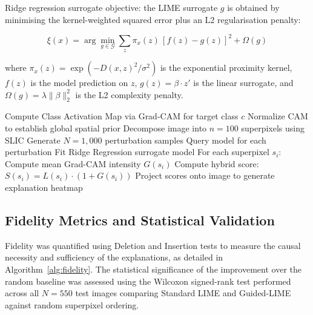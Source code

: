 \documentclass[10pt,twoside]{article}
\begin{document}
Ridge regression surrogate objective: the LIME surrogate $g$ is obtained by minimising the kernel-weighted squared error plus an L2 regularisation penalty:

\begin{equation}
\label{eq:ridge}
\xi(x) = \arg\min_{g \in \mathcal{G}} \sum_{z} \pi_x(z)\,[f(z) - g(z)]^2 + \Omega(g)
\end{equation}

\noindent where $\pi_x(z) = \exp(-D(x,z)^2/\sigma^2)$ is the exponential proximity kernel, $f(z)$ is the model prediction on $z$, $g(z) = \beta \cdot z'$ is the linear surrogate, and $\Omega(g) = \lambda \|\beta\|_2^2$ is the L2 complexity penalty.

\begin{algorithm}[ht]
\caption{Guided-LIME Hybrid Interpretation Framework}\label{alg:guidedlime}
\begin{algorithmic}[1]
\State Compute Class Activation Map via Grad-CAM for target class $c$
\State Normalize CAM to establish global spatial prior
\State Decompose image into $n = 100$ superpixels using SLIC
\State Generate $N = 1{,}000$ perturbation samples
\State Query model for each perturbation
\State Fit Ridge Regression surrogate model
\State For each superpixel $s_i$:
\State \quad Compute mean Grad-CAM intensity $G(s_i)$
\State \quad Compute hybrid score: $S(s_i) = L(s_i) \cdot (1 + G(s_i))$
\State Project scores onto image to generate explanation heatmap
\end{algorithmic}
\end{algorithm}

\subsection{Fidelity Metrics and Statistical Validation}

Fidelity was quantified using Deletion and Insertion tests to measure the causal necessity and sufficiency of the explanations, as detailed in Algorithm~\ref{alg:fidelity}. The statistical significance of the improvement over the random baseline was assessed using the Wilcoxon signed-rank test performed across all $N = 550$ test images comparing Standard LIME and Guided-LIME against random superpixel ordering.
\end{document}
